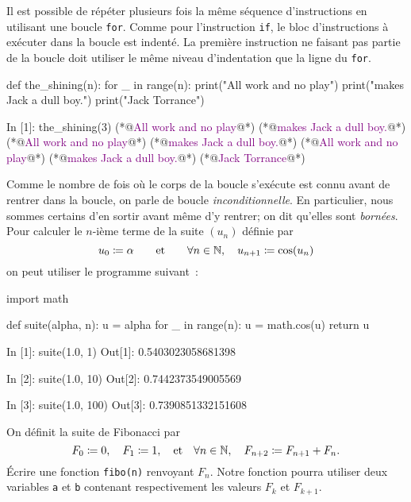 \documentclass{magnolia}
\begin{document}
Il est possible de répéter plusieurs fois la même séquence d'instructions en utilisant une boucle \verb_for_.
Comme pour l'instruction \verb_if_, le bloc d'instructions à exécuter dans la boucle est indenté.
La première instruction ne faisant pas partie de la boucle doit utiliser le même niveau d'indentation que la ligne du \verb_for_. 

\begin{pythoncodeline}
def the_shining(n):
    for _ in range(n):
        print("All work and no play")
        print("makes Jack a dull boy.")
    print("Jack Torrance")
\end{pythoncodeline}

\begin{pythoncode}
In [1]: the_shining(3)
(*@\textcolor{purple}{All work and no play}@*)
(*@\textcolor{purple}{makes Jack a dull boy.}@*)
(*@\textcolor{purple}{All work and no play}@*)
(*@\textcolor{purple}{makes Jack a dull boy.}@*)
(*@\textcolor{purple}{All work and no play}@*)
(*@\textcolor{purple}{makes Jack a dull boy.}@*)
(*@\textcolor{purple}{Jack Torrance}@*)
\end{pythoncode}
\noindent
Comme le nombre de fois où le corps de la boucle s'exécute est connu avant de
rentrer dans la boucle, on parle de boucle \emph{inconditionnelle}. En particulier, nous
sommes certains d'en sortir avant même d'y rentrer; on dit qu'elles
sont \emph{bornées}.\\

Pour calculer le $n$-ième terme de la suite $(u_n)$ définie par
\[u_0 \coloneqq \alpha \qquad\text{et}\qquad \forall n\in\mathbb{N} ,\quad u_{n+1}\coloneqq \cos(u_n)\]
on peut utiliser le programme suivant~:

\begin{pythoncodeline}
import math

def suite(alpha, n):
    u = alpha
    for _ in range(n):
        u = math.cos(u)
    return u
\end{pythoncodeline}

\begin{pythoncode}
In [1]: suite(1.0, 1)
Out[1]: 0.5403023058681398

In [2]: suite(1.0, 10)
Out[2]: 0.7442373549005569

In [3]: suite(1.0, 100)
Out[3]: 0.7390851332151608
\end{pythoncode}


\begin{exoUnique}
\exo On définit la suite de Fibonacci par
\[F_0\coloneqq 0,\quad F_1\coloneqq 1,\quad \text{et}\quad \forall n\in\mathbb{N},\quad F_{n+2}\coloneqq F_{n+1}+F_n.\]
Écrire une fonction \verb!fibo(n)! renvoyant $F_n$. Notre fonction pourra utiliser deux
variables \verb_a_ et \verb_b_ contenant respectivement les valeurs $F_k$ et $F_{k+1}$.
\end{exoUnique}
\end{document}
